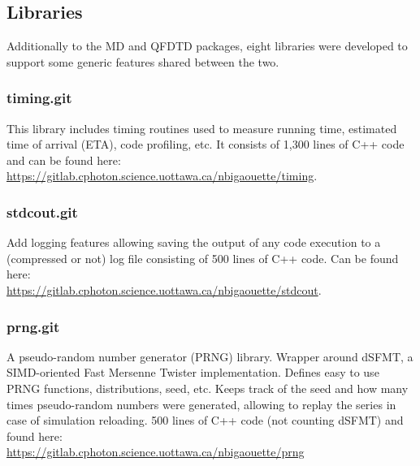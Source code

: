 \subsection{Libraries}
\label{section:tools:libraries}

Additionally to the MD and QFDTD packages, eight libraries were developed to
support some generic features shared between the two.



\subsubsection{timing.git} \label{section:tools:libraries:timing}

This library includes timing routines used to measure running time, estimated
time of arrival (ETA), code profiling, etc. It consists of 1,300 lines of C++
code and can be found here:
\url{https://gitlab.cphoton.science.uottawa.ca/nbigaouette/timing}.


\subsubsection{stdcout.git} \label{section:tools:libraries:stdcout}

Add logging features allowing saving the output of any code execution to a
(compressed or not) log file consisting of 500 lines of C++ code.
Can be found here:\\
\url{https://gitlab.cphoton.science.uottawa.ca/nbigaouette/stdcout}.


\subsubsection{prng.git} \label{section:tools:libraries:prng}

A pseudo-random number generator (PRNG) library. Wrapper around
dSFMT\cite{prng2009}, a SIMD-oriented Fast Mersenne Twister implementation.
Defines easy to use PRNG functions, distributions, seed, etc. Keeps track of
the seed and how many times pseudo-random numbers were generated, allowing
to replay the series in case of simulation reloading. 500 lines of C++ code
(not counting dSFMT) and found here:\\
\url{https://gitlab.cphoton.science.uottawa.ca/nbigaouette/prng}


